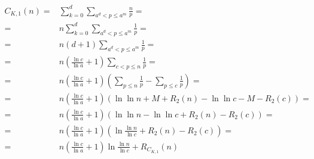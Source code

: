 \documentclass{article}
\begin{document}
\begin{align*}
C_{K,1}(n) =& \sum_{k=0}^{d} \sum_{a^d < p \le a^m} \frac{n}{p} = \\
=& n \sum_{k=0}^{d} \sum_{a^d < p \le a^m} \frac{1}{p} = \\
=& n \left( d + 1 \right) \sum_{a^d < p \le a^m} \frac{1}{p} = \\
=& n \left( \frac{\ln{c}}{\ln{a}} + 1 \right) \sum_{c < p \le n} \frac{1}{p} = \\
=& n \left( \frac{\ln{c}}{\ln{a}} + 1 \right) \left( \sum_{p \le n} \frac{1}{p} - \sum_{p \le c} \frac{1}{p} \right) = \\
=& n \left( \frac{\ln{c}}{\ln{a}} + 1 \right) \left( \ln{\ln{n}} + M + R_2(n) - \ln{\ln{c}} - M - R_2(c) \right) = \\
=& n \left( \frac{\ln{c}}{\ln{a}} + 1 \right) \left( \ln{\ln{n}} - \ln{\ln{c}} + R_2(n) - R_2(c) \right) = \\
=& n \left( \frac{\ln{c}}{\ln{a}} + 1 \right) \left( \ln{\frac{\ln{n}}{\ln{c}}} + R_2(n) - R_2(c) \right) = \\
=& n \left( \frac{\ln{c}}{\ln{a}} + 1 \right) \ln{\frac{\ln{n}}{\ln{c}}} + R_{C_{K,1}}(n)
\end{align*}
\end{document}
